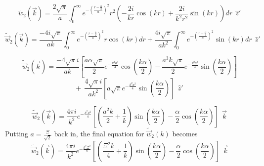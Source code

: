 \documentclass[double,12pt]{beavtex}
\begin{document}
\begin{equation}{\widetilde{w}_2(\vec{k})=\frac{2\sqrt{\pi}}{a}\int_{0}^{\infty}e^{-\left(\frac{r-\frac{\alpha}{2}}{a}\right)^2}r^2\left(-\frac{2i}{kr}\cos(kr) + \frac{2i}{k^2r^2}\sin(kr)\right)d{r}{~~}\hat{z}'}\end{equation}

\begin{equation}{\widetilde{\vec{w}}_2(\vec{k})=\frac{-4i\sqrt{\pi}}{ak}\int_{0}^{\infty}e^{-\left(\frac{r-\frac{\alpha}{2}}{a}\right)^2}r\cos(kr)d{r} + \frac{4i\sqrt{\pi}}{ak^2}\int_{0}^{\infty}e^{-\left(\frac{r-\frac{\alpha}{2}}{a}\right)^2}\sin(kr)d{r}{~~}\hat{z}'}\end{equation}

\begin{equation}{\widetilde{\vec{w}}_2(\vec{k})=\frac{-4\sqrt{\pi}i}{ak}\left[\frac{a\alpha\sqrt{\pi}}{2}e^{-\frac{k^2a^2}{4}}\cos\left(\frac{k\alpha}{2}\right)-\frac{a^3k\sqrt{\pi}}{2}e^{-\frac{k^2a^2}{4}}\sin\left(\frac{k\alpha}{2}\right)\right]}\end{equation} 
\begin{displaymath}{+{~~}\frac{4\sqrt{\pi}i}{ak^2}\left[a\sqrt{\pi}e^{-\frac{k^2a^2}{4}}\sin\left(\frac{k\alpha}{2}\right)\right]{~~}\hat{z}'}\end{displaymath}

\begin{equation}{\widetilde{\vec{w}}_2(\vec{k})=\frac{4\pi{i}}{k^2}e^{-\frac{k^2a^2}{4}}\left[\left(\frac{a^2k}{2}+\frac{1}{k}\right)\sin\left(\frac{k\alpha}{2}\right)-\frac{\alpha}{2}\cos\left(\frac{k\alpha}{2}\right)\right]{~~}\vec{k}}\end{equation} 
Putting $a=\frac{\Xi}{\sqrt{2}}$ back in, the final equation for 
$\widetilde{\vec{w}}_2(k)$ becomes
\begin{equation}{\widetilde{\vec{w}}_2(\vec{k})=\frac{4\pi{i}}{k^2}e^{-\frac{k^2\Xi^2}{8}}\left[\left(\frac{\Xi^2k}{4}+\frac{1}{k}\right)\sin\left(\frac{k\alpha}{2}\right)-\frac{\alpha}{2}\cos\left(\frac{k\alpha}{2}\right)\right]{~~}\vec{k}}\end{equation} 
\end{document}
